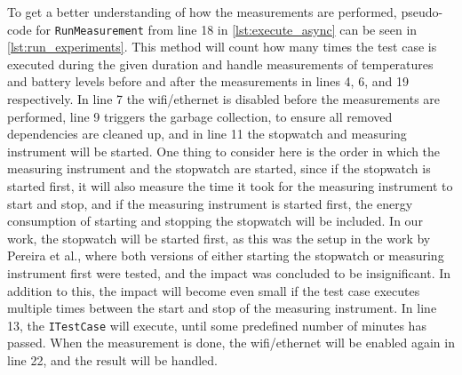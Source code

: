 To get a better understanding of how the measurements are performed, pseudo-code for \texttt{RunMeasurement} from line 18 in \cref{lst:execute_async} can be seen in \cref{lst:run_experiments}. This method will count how many times the test case is executed during the given duration and handle measurements of temperatures and battery levels before and after the measurements in lines 4, 6, and 19 respectively. In line 7 the wifi/ethernet is disabled before the measurements are performed, line 9 triggers the garbage collection, to ensure all removed dependencies are cleaned up, and in line 11 the stopwatch and measuring instrument will be started. One thing to consider here is the order in which the measuring instrument and the stopwatch are started, since if the stopwatch is started first, it will also measure the time it took for the measuring instrument to start and stop, and if the measuring instrument is started first, the energy consumption of starting and stopping the stopwatch will be included. In our work, the stopwatch will be started first, as this was the setup in the work by Pereira et al.\cite[]{Pereira2017}, where both versions of either starting the stopwatch or measuring instrument first were tested, and the impact was concluded to be insignificant. In addition to this, the impact will become even small if the test case executes multiple times between the start and stop of the measuring instrument. In line 13, the \texttt{ITestCase} will execute, until some predefined number of minutes has passed. When the measurement is done, the wifi/ethernet will be enabled again in line 22, and the result will be handled.





